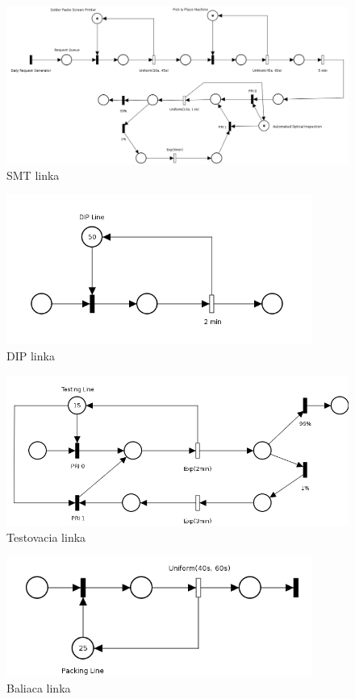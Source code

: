 \documentclass[12pt,a4paper,titlepage,final]{article}
\begin{document}
\begin{figure}[!ht]
  \centering
  \includegraphics[width=17cm]{doc/smt.png}
  \caption{SMT linka}
\end{figure}

\begin{figure}[!ht]
  \centering
  \includegraphics[width=10cm]{doc/dip.png}
  \caption{DIP linka}
\end{figure}

\begin{figure}[!ht]
  \centering
  \includegraphics[width=14cm]{doc/tst.png}
  \caption{Testovacia linka}
\end{figure}

\begin{figure}[!ht]
  \centering
  \includegraphics[width=10cm]{doc/pkg.png}
  \caption{Baliaca linka}
\end{figure}
\end{document}
